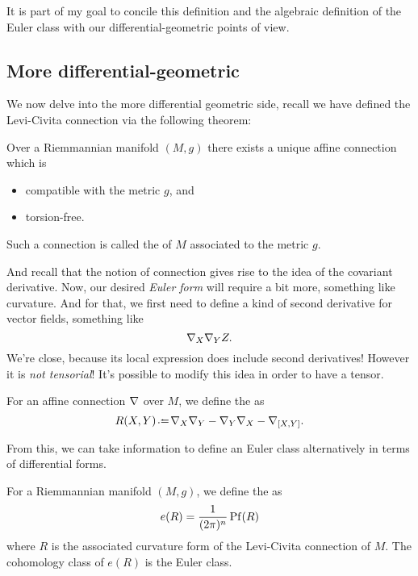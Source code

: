 \documentclass[12pt]{memoir}
\begin{document}
It is part of my goal to concile this definition and the algebraic definition of the Euler class with our differential-geometric points of view.

\subsection{More differential-geometric}
We now delve into the more differential geometric side, recall we have defined the Levi-Civita connection via the following theorem:

\begin{Th}
    Over a Riemmannian manifold $(M,g)$ there exists a unique affine connection which is 
    \begin{itemize}
        \item compatible with the metric $g$, and
        \item torsion-free.
    \end{itemize}
    Such a connection is called the  of $M$ associated to the metric $g$.
\end{Th}

And recall that the notion of connection gives rise to the idea of the covariant derivative. Now, our desired \emph{Euler form} will require a bit more, something like curvature. And for that, we first need to define a kind of second derivative for vector fields, something like
$${\mathbf{\nabla}}_X{\mathbf{\nabla}}_YZ.$$
We're close, because its local expression does include second derivatives! However it is \emph{not tensorial}! It's possible to modify this idea in order to have a tensor.

\begin{Def}
    For an affine connection ${\mathbf{\nabla}}$ over $M$, we define the  as 
    $$R(X,Y)\defeq \nbf_X\nbf_Y-\nbf_Y\nbf_X-\nbf_{[X,Y]}.$$
\end{Def}

From this, we can take information to define an Euler class alternatively in terms of differential forms. 

\begin{Def}
    For a Riemmannian manifold $(M,g)$, we define the  as 
    $$e(R)=\frac{1}{(2\pi)^n}\operatorname{Pf}(R)$$
    where $R$ is the associated curvature form of the Levi-Civita connection of $M$. The cohomology class of $e(R)$ is the Euler class.
\end{Def}
\end{document}
